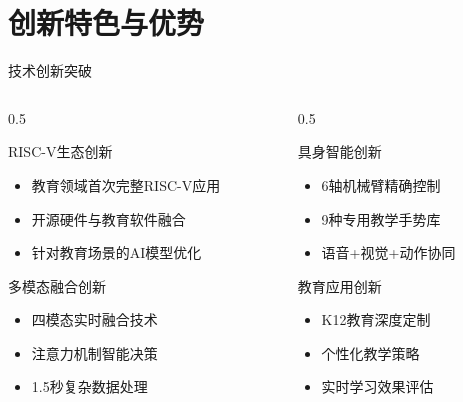 \documentclass[aspectratio=169,12pt]{beamer}
\begin{document}
\section{创新特色与优势}

\begin{frame}{技术创新突破}
    \begin{columns}
        \begin{column}{0.5\textwidth}
            \begin{block}{RISC-V生态创新}
                \begin{itemize}
                    \item 教育领域首次完整RISC-V应用
                    \item 开源硬件与教育软件融合
                    \item 针对教育场景的AI模型优化
                \end{itemize}
            \end{block}
            
            \begin{block}{多模态融合创新}
                \begin{itemize}
                    \item 四模态实时融合技术
                    \item 注意力机制智能决策
                    \item 1.5秒复杂数据处理
                \end{itemize}
            \end{block}
        \end{column}
        \begin{column}{0.5\textwidth}
            \begin{block}{具身智能创新}
                \begin{itemize}
                    \item 6轴机械臂精确控制
                    \item 9种专用教学手势库
                    \item 语音+视觉+动作协同
                \end{itemize}
            \end{block}
            
            \begin{block}{教育应用创新}
                \begin{itemize}
                    \item K12教育深度定制
                    \item 个性化教学策略
                    \item 实时学习效果评估
                \end{itemize}
            \end{block}
        \end{column}
    \end{columns}
\end{frame}
\end{document}
